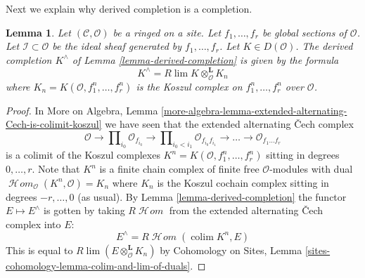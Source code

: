 \documentclass{stacks-project}
\theoremstyle{plain}
\newtheorem{lemma}[subsection]{Lemma}
\theoremstyle{definition}
\theoremstyle{remark}
\numberwithin{equation}{subsection}
\def\lim{\mathop{\mathrm{lim}}\nolimits}
\def\colim{\mathop{\mathrm{colim}}\nolimits}
\def\SheafHom{\mathop{\mathcal{H}\!\mathit{om}}\nolimits}
\begin{document}
\noindent
Next we explain why derived completion is a completion.

\begin{lemma}
\label{lemma-derived-completion-koszul}
Let $(\mathcal{C}, \mathcal{O})$ be a ringed on a site. Let $f_1, \ldots, f_r$
be global sections of $\mathcal{O}$. Let $\mathcal{I} \subset \mathcal{O}$ be
the ideal sheaf generated by $f_1, \ldots, f_r$. Let $K \in D(\mathcal{O})$.
The derived completion $K^\wedge$ of Lemma \ref{lemma-derived-completion}
is given by the formula
$$
K^\wedge = R\lim K \otimes^\mathbf{L}_\mathcal{O} K_n
$$
where $K_n = K(\mathcal{O}, f_1^n, \ldots, f_r^n)$
is the Koszul complex on $f_1^n, \ldots, f_r^n$ over $\mathcal{O}$.
\end{lemma}

\begin{proof}
In More on Algebra, Lemma
\ref{more-algebra-lemma-extended-alternating-Cech-is-colimit-koszul}
we have seen that the extended alternating {\v C}ech complex
$$
\mathcal{O} \to \prod\nolimits_{i_0} \mathcal{O}_{f_{i_0}} \to
\prod\nolimits_{i_0 < i_1} \mathcal{O}_{f_{i_0}f_{i_1}} \to
\ldots \to \mathcal{O}_{f_1\ldots f_r}
$$
is a colimit of the Koszul complexes
$K^n = K(\mathcal{O}, f_1^n, \ldots, f_r^n)$ sitting in
degrees $0, \ldots, r$. Note that $K^n$ is a finite chain complex
of finite free $\mathcal{O}$-modules with dual
$\SheafHom_\mathcal{O}(K^n, \mathcal{O}) = K_n$ where $K_n$ is the Koszul
cochain complex sitting in degrees $-r, \ldots, 0$ (as usual). By
Lemma \ref{lemma-derived-completion}
the functor $E \mapsto E^\wedge$ is gotten by taking
$R\SheafHom$ from the extended alternating {\v C}ech complex into $E$:
$$
E^\wedge = R\SheafHom(\colim K^n, E)
$$
This is equal to $R\lim (E \otimes_\mathcal{O}^\mathbf{L} K_n)$
by
Cohomology on Sites, Lemma \ref{sites-cohomology-lemma-colim-and-lim-of-duals}.
\end{proof}
\end{document}
